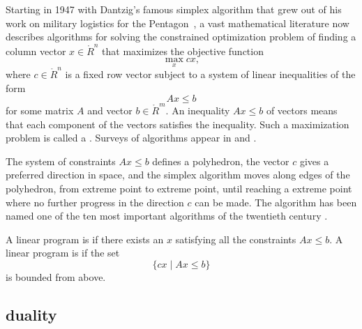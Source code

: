 Starting in 1947 with Dantzig's famous simplex algorithm that grew out
of his work on military logistics for the Pentagon~\cite{Dan91}, a
vast mathematical literature now describes algorithms for solving the
constrained optimization problem of finding a column vector
$x\in\ring{R}^n$ that maximizes the objective function
\begin{equation}\label{eqn:lp1}
\max_{x}  c x,
\end{equation}
where $c\in\ring{R}^n$ is a fixed row vector subject to a system of
linear inequalities of the form
\begin{equation}\label{eqn:lp2}
A x\le b
\end{equation} 
for some matrix $A$ and vector $b\in \ring{R}^m$.  An inequality $A
x\le b$ of vectors means that each component of the vectors satisfies
the inequality.  Such a maximization problem is called a
.  Surveys of algorithms appear in
\cite{Wri05} and \cite{Tod02}.  

The system of constraints $A x \le b$ defines a polyhedron, the vector
$c$ gives a preferred direction in space, and the simplex algorithm
moves along edges of the polyhedron, from extreme point to extreme
point, until reaching a extreme point where no further progress in the
direction $c$ can be made.  The algorithm has been named one of the
ten most important algorithms of the twentieth century \cite{Cip00}.


A linear program is  if there exists an $x$ satisfying
all the constraints $A x \le b$.  A linear program is 
if the set 
\[
\{c x \mid A x \le b\}
\]
is bounded from above.

\subsection{duality}

